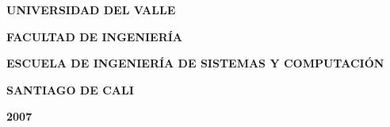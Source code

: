 \begin{center} \textbf{UNIVERSIDAD DEL VALLE} \end{center}
\begin{center} \textbf{FACULTAD DE INGENIERÍA} \end{center}
\begin{center} \textbf{ESCUELA DE INGENIERÍA DE SISTEMAS Y COMPUTACIÓN} \end{center}
\begin{center} \textbf{SANTIAGO DE CALI} \end{center}
\begin{center} \textbf{2007} \end{center}

\newpage







